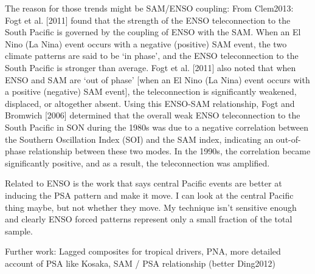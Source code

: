 The reason for those trends might be SAM/ENSO coupling: From Clem2013: Fogt et al. [2011] found that the strength of the ENSO teleconnection to the South Pacific is governed by the coupling of ENSO with the SAM. When an El Nino (La Nina) event occurs with a negative (positive) SAM event, the two climate patterns are said to be ‘in phase’, and the ENSO teleconnection to the South Pacific is stronger than average. Fogt et al. [2011] also noted that when ENSO and SAM are ‘out of phase’ [when an El Nino (La Nina) event occurs with a positive (negative) SAM event], the teleconnection is significantly weakened, displaced, or altogether absent. Using this ENSO-SAM relationship, Fogt and Bromwich [2006] determined that the overall weak ENSO teleconnection to the South Pacific in SON during the 1980s was due to a negative correlation between the Southern Oscillation Index (SOI) and the SAM index, indicating an out-of-phase relationship between these two modes. In the 1990s, the correlation became significantly positive, and as a result, the teleconnection was amplified.

Related to ENSO is the work that says central Pacific events are better at inducing the PSA pattern and make it move. I can look at the central Pacific thing maybe, but not whether they move. My technique isn't sensitive enough and clearly ENSO forced patterns represent only a small fraction of the total sample.




Further work: Lagged composites for tropical drivers, PNA, more detailed account of PSA like Kosaka, SAM / PSA relationship (better Ding2012)